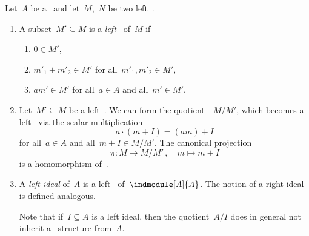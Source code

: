 \begin{remarkdefinition}
  Let~$A$ be a~{\kalg} and let~$M$,~$N$ be two left~{}.
  \begin{enumerate}
    \item
      A subset~$M' \subseteq M$ is a \emph{left~{}} of~$M$ if
      \begin{enumerate}[label=(S\arabic*)]
        \item
          $0 \in M'$,
        \item
          $m'_1 + m'_2 \in M'$ for all~$m'_1, m'_2 \in M'$,
        \item
          $a m' \in M'$ for all~$a \in A$ and all~$m' \in M'$.
      \end{enumerate}
    \item
      Let~$M' \subseteq M$ be a left~{}.
      We can form the quotient~{\module{$\kf$}}~$M/M'$, which becomes a left~{} via the scalar multiplication
      \[
          a \cdot (m + I)
        = (am) + I
      \]
      for all~$a \in A$ and all~$m + I \in M/M'$.
      The canonical projection
      \[
                \pi
        \colon  M
        \to     M/M' \,,
        \quad   m
        \mapsto m + I
      \]
      is a homomorphism of~{}.
    \item
      A \emph{left ideal} of~$A$ is a left~{} of~$\indmodule[A]{A}$.
      The notion of a right ideal is defined analogous.
      
      Note that if~$I \subseteq A$ is a left ideal, then the quotient~$A/I$ does in general not inherit a~{\kalg} structure from~$A$.


\end{enumerate}
\end{remarkdefinition}
